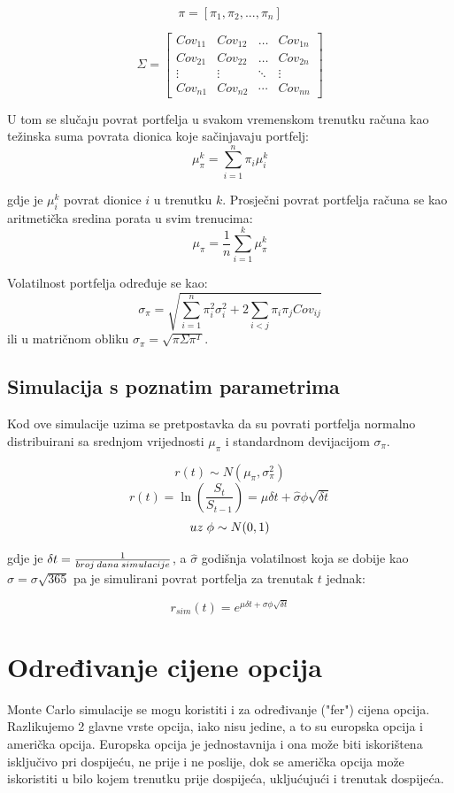 \documentclass[times, utf8, seminar]{fer}
\begin{document}
\[ \pi = [\pi_1, \pi_2,...,\pi_n] \]

\begin{equation*}
\Sigma =
\begin{bmatrix}
    Cov_{11} & Cov_{12} & \ldots & Cov_{1n} \\
    Cov_{21} & Cov_{22} & \ldots & Cov_{2n} \\
    \vdots & \vdots & \ddots & \vdots \\
    Cov_{n1} & Cov_{n2} & \cdots & Cov_{nn}
\end{bmatrix}
\end{equation*}

U tom se slučaju povrat portfelja u svakom vremenskom trenutku računa kao težinska suma povrata dionica koje sačinjavaju portfelj:
\[ \mu_{\pi}^k = \sum_{i=1}^{n}\pi_i\mu_i^k \]

\noindent gdje je $\mu_i^k$ povrat dionice $i$ u trenutku $k$. Prosječni povrat portfelja računa se kao aritmetička sredina porata u svim trenucima:
\[ \mu_{\pi} = \frac{1}{n}\sum_{i=1}^{k}\mu_{\pi}^{k} \]

\noindent Volatilnost portfelja određuje se kao:
\[ \sigma_{\pi} = \sqrt{\sum_{i=1}^{n}\pi_i^2\sigma_i^2 + 2\sum_{i<j}\pi_i\pi_jCov_{ij}}\]
ili u matričnom obliku \( \sigma_{\pi} = \sqrt{\pi\Sigma\pi^T} \).

\subsection{Simulacija s poznatim parametrima}
Kod ove simulacije uzima se pretpostavka da su povrati portfelja normalno distribuirani sa srednjom vrijednosti $\mu_{\pi}$ i standardnom devijacijom $\sigma_{\pi}$.

\[ r(t) \sim N(\mu_{\pi}, \sigma_{\pi}^2)\]
\[ r(t) = \ln(\frac{S_{t}}{S_{t-1}}) = \mu\delta t + \hat{\sigma}\phi\sqrt{\delta t}\]
\[ uz \hspace{0.1cm} \phi \sim N(0,1) \]

\noindent gdje je $\delta t = \frac{1}{broj \hspace{0.07cm} dana \hspace{0.07cm} simulacije}$, a $\hat{\sigma}$ godišnja volatilnost koja se dobije kao $\hat{\sigma} = \sigma\sqrt{365}$ pa je simulirani povrat portfelja za trenutak $t$ jednak:

\[ r_{sim}(t) = e^{\mu\delta t + \sigma\phi\sqrt{\delta t}} \]

\section{Određivanje cijene opcija}
Monte Carlo simulacije se mogu koristiti i za određivanje ("fer") cijena opcija. Razlikujemo 2 glavne vrste opcija, iako nisu jedine, a to su europska opcija i američka opcija. Europska opcija je jednostavnija i ona može biti iskorištena  isključivo pri dospijeću, ne prije i ne poslije, dok se američka opcija može iskoristiti u bilo kojem trenutku prije dospijeća, ukljućujući i trenutak dospijeća.
\end{document}

